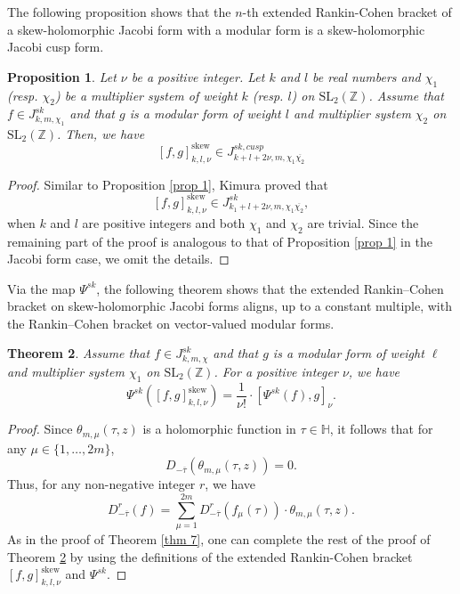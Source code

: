 \documentclass[11pt]{amsart}
\newtheorem{thm}{Theorem}[section]
\newtheorem{prop}[thm]{Proposition}
\theoremstyle{definition}
\theoremstyle{remark}
\numberwithin{equation}{section}
\renewcommand{\(}{\left(}
\renewcommand{\)}{\right)}
\begin{document}
The following proposition shows that the $n$-th extended Rankin-Cohen bracket of a skew-holomorphic Jacobi form with a modular form is a skew-holomorphic Jacobi cusp form. 

\begin{prop}\cite[Proposition 1.3]{K}\label{prop 4}
    Let $\nu$ be a positive integer.
    Let $k$ and $l$ be real numbers and $\chi_1$ (resp. $\chi_2$) be a multiplier system of weight $k$ (resp. $l$) on $\mathrm{SL}_{2}(\mathbb{Z})$. 
    Assume that $f\in J^{sk}_{k,m,\chi_1}$ and that
    $g$ is a modular form of weight $l$ and multiplier system $\chi_2$ on $\mathrm{SL}_{2}(\mathbb{Z})$.
    Then, we have 
    \[ [f,g]^{\mathrm{skew}}_{k,l,\nu}\in J^{sk,cusp}_{k+l+2\nu,m,\chi_1\overline{\chi_2}} \]
\end{prop}
\begin{proof}
    Similar to Proposition \ref{prop 1}, Kimura \cite{K} proved that 
    \[ [f,g]^{\mathrm{skew}}_{k,l,\nu}\in J^{sk}_{k_1+l+2\nu,m,\chi_1\overline{\chi_2}}, \]
    when $k$ and $l$ are positive integers and both $\chi_1$ and $\chi_2$ are trivial.
    Since the remaining part of the proof is analogous to that of Proposition \ref{prop 1} in the Jacobi form case, we omit the details.  
\end{proof}

Via the map $\Psi^{sk}$, the following theorem shows that the extended Rankin–Cohen bracket on skew-holomorphic Jacobi forms aligns, up to a constant multiple, with the  Rankin–Cohen bracket on vector-valued modular forms.

\begin{thm}\label{thm 8}
    Assume that $f\in J^{sk}_{k,m,\chi}$ and that $g$ is a modular form of weight $\ell$ and multiplier system $\chi_1$ on $\mathrm{SL}_{2}(\mathbb{Z})$. 
    For a positive integer $\nu$, we have 
    \[ \Psi^{sk}\left([f,g]^{\mathrm{skew}}_{k,l,\nu}\right) = \frac{1}{\nu !}\cdot[\Psi^{sk}(f),g]_{\nu}. \]
\end{thm}

\begin{proof}
    Since $\theta_{m,\mu}(\tau,z)$ is a holomorphic function in $\tau\in \mathbb{H}$, it follows that for any $\mu\in \{1,\dots,2m\}$, 
    \[ D_{-\overline{\tau}}(\theta_{m,\mu}(\tau,z))=0.\]
    Thus, for any non-negative integer $r$, we have 
    \[ D^{r}_{-\overline{\tau}}(f)=\sum_{\mu=1}^{2m} D^{r}_{-\overline{{\tau}}}(f_{\mu}(\tau))\cdot \theta_{m,\mu}(\tau,z). \]
    As in the proof of Theorem \ref{thm 7}, one can complete the rest of the proof of Theorem \ref{thm 8} by using the definitions of the extended Rankin-Cohen bracket $[f,g]_{k,l,\nu}^{\mathrm{skew}}$ and $\Psi^{sk}$. 
\end{proof}
\end{document}
